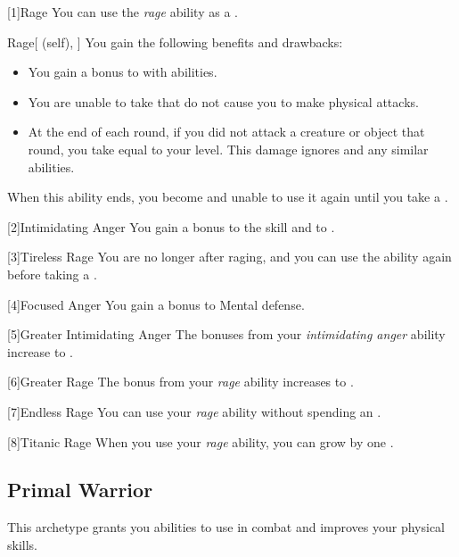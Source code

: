         [1]{Rage} You can use the \textit{rage} ability as a .
        \begin{attuneability}{Rage}[ (self), ]
            You gain the following benefits and drawbacks:
            \begin{itemize}
                \item You gain a  bonus to  with  abilities.
                \item You are unable to take  that do not cause you to make physical attacks.
                \item At the end of each round, if you did not attack a creature or object that round, you take  equal to your level.
                    This damage ignores  and any similar abilities.
            \end{itemize}
            When this ability ends, you become \fatigued and unable to use it again until you take a .
        \end{attuneability}

        [2]{Intimidating Anger}
        You gain a  bonus to the  skill and to .

        [3]{Tireless Rage} You are no longer  after raging, and you can use the ability again before taking a .

        [4]{Focused Anger} You gain a  bonus to Mental defense.

        [5]{Greater Intimidating Anger}
        The bonuses from your \textit{intimidating anger} ability increase to .

        [6]{Greater Rage} The  bonus from your \textit{rage} ability increases to .

        [7]{Endless Rage}
        You can use your \textit{rage} ability without spending an .

        [8]{Titanic Rage}
        When you use your \textit{rage} ability, you can grow by one .

    \subsection{Primal Warrior}
        This archetype grants you abilities to use in combat and improves your physical skills.

